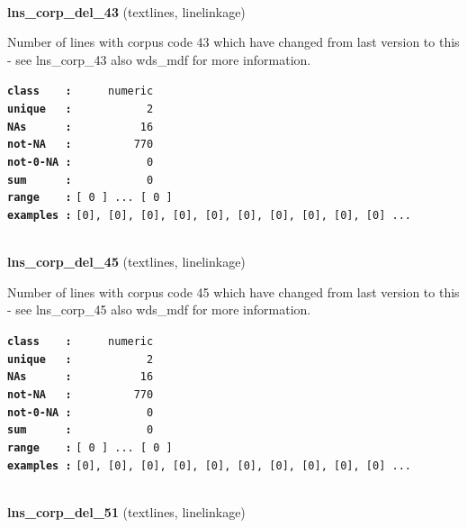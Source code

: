 \documentclass[]{article}
\begin{document}
~

\textbf{lns\_corp\_del\_43} (textlines, linelinkage)

Number of lines with corpus code 43 which have changed from last version
to this - see lns\_corp\_43 also wds\_mdf for more information.

\textbf{\texttt{class\ \ \ \ :}} \texttt{~~~~~numeric}\\
\textbf{\texttt{unique\ \ \ :}} \texttt{~~~~~~~~~~~2}\\
\textbf{\texttt{NAs\ \ \ \ \ \ :}} \texttt{~~~~~~~~~~16}\\
\textbf{\texttt{not-NA\ \ \ :}} \texttt{~~~~~~~~~770}\\
\textbf{\texttt{not-0-NA\ :}} \texttt{~~~~~~~~~~~0}\\
\textbf{\texttt{sum\ \ \ \ \ \ :}} \texttt{~~~~~~~~~~~0}\\
\textbf{\texttt{range\ \ \ \ :}}
\texttt{{[}\ 0\ {]}\ ...\ {[}\ 0\ {]}}\\
\textbf{\texttt{examples\ :}}
\texttt{{[}0{]},\ {[}0{]},\ {[}0{]},\ {[}0{]},\ {[}0{]},\ {[}0{]},\ {[}0{]},\ {[}0{]},\ {[}0{]},\ {[}0{]}\ ...}\\

~

\textbf{lns\_corp\_del\_45} (textlines, linelinkage)

Number of lines with corpus code 45 which have changed from last version
to this - see lns\_corp\_45 also wds\_mdf for more information.

\textbf{\texttt{class\ \ \ \ :}} \texttt{~~~~~numeric}\\
\textbf{\texttt{unique\ \ \ :}} \texttt{~~~~~~~~~~~2}\\
\textbf{\texttt{NAs\ \ \ \ \ \ :}} \texttt{~~~~~~~~~~16}\\
\textbf{\texttt{not-NA\ \ \ :}} \texttt{~~~~~~~~~770}\\
\textbf{\texttt{not-0-NA\ :}} \texttt{~~~~~~~~~~~0}\\
\textbf{\texttt{sum\ \ \ \ \ \ :}} \texttt{~~~~~~~~~~~0}\\
\textbf{\texttt{range\ \ \ \ :}}
\texttt{{[}\ 0\ {]}\ ...\ {[}\ 0\ {]}}\\
\textbf{\texttt{examples\ :}}
\texttt{{[}0{]},\ {[}0{]},\ {[}0{]},\ {[}0{]},\ {[}0{]},\ {[}0{]},\ {[}0{]},\ {[}0{]},\ {[}0{]},\ {[}0{]}\ ...}\\

~

\textbf{lns\_corp\_del\_51} (textlines, linelinkage)
\end{document}

